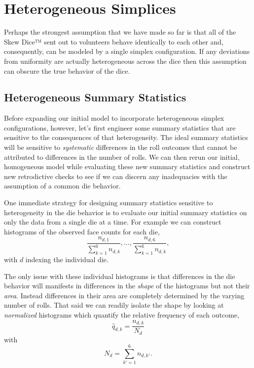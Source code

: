 \documentclass[
  letterpaper,
  DIV=11,
  numbers=noendperiod]{scrartcl}
\begin{document}
\section{Heterogeneous Simplices}\label{heterogeneous-simplices}

Perhaps the strongest assumption that we have made so far is that all of
the Skew Dice™ sent out to volunteers behave identically to each other
and, consequently, can be modeled by a single simplex configuration. If
any deviations from uniformity are actually heterogeneous across the
dice then this assumption can obscure the true behavior of the dice.

\subsection{Heterogeneous Summary
Statistics}\label{heterogeneous-summary-statistics}

Before expanding our initial model to incorporate heterogeneous simplex
configurations, however, let's first engineer some summary statistics
that are sensitive to the consequences of that heterogeneity. The ideal
summary statistics will be sensitive to \emph{systematic} differences in
the roll outcomes that cannot be attributed to differences in the number
of rolls. We can then rerun our initial, homogeneous model while
evaluating these new summary statistics and construct new retrodictive
checks to see if we can discern any inadequacies with the assumption of
a common die behavior.

One immediate strategy for designing summary statistics sensitive to
heterogeneity in the die behavior is to evaluate our initial summary
statistics on only the data from a single die at a time. For example we
can construct histograms of the observed face counts for each die, \[
\frac{ n_{d, 1} }{ \sum_{k = 1}^{6} n_{d, k} }, \ldots,
\frac{ n_{d, 6} }{ \sum_{k = 1}^{6} n_{d, k} },
\] with \(d\) indexing the individual die.

The only issue with these individual histograms is that differences in
the die behavior will manifests in differences in the \emph{shape} of
the histograms but not their \emph{area}. Instead differences in their
area are completely determined by the varying number of rolls. That said
we can readily isolate the shape by looking at \emph{normalized}
histograms which quantify the relative frequency of each outcome, \[
\hat{q}_{d, k} = \frac{ n_{d, k} }{ N_{d} }
\] with \[
N_{d} = \sum_{k' = 1}^{6} n_{d, k'}.
\]
\end{document}
